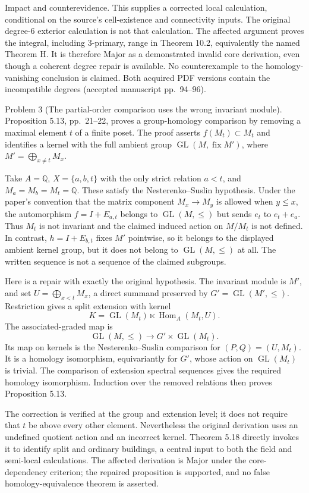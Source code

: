 \documentclass[10pt]{article}
\begin{document}
Impact and counterevidence. This supplies a corrected local calculation, conditional on the source’s cell-existence and connectivity inputs. The original degree-\(6\) exterior calculation is not that calculation. The affected argument proves the integral, including \(3\)-primary, range in Theorem 10.2, equivalently the named Theorem H. It is therefore Major as a demonstrated invalid core derivation, even though a coherent degree repair is available. No counterexample to the homology-vanishing conclusion is claimed. Both acquired PDF versions contain the incompatible degrees (accepted manuscript pp. 94–96).\par
Problem 3 (The partial-order comparison uses the wrong invariant module).  Proposition 5.13, pp. 21–22, proves a group-homology comparison by removing a maximal element \(t\) of a finite poset. The proof asserts \(f(M_t)\subset M_t\) and identifies a kernel with the full ambient group \(\operatorname{GL}(M,\operatorname{fix}M')\), where \(M'=\bigoplus_{x\ne t}M_x\).\par
Take \(A=\mathbb Q\), \(X=\{a,b,t\}\) with the only strict relation \(a<t\), and \(M_a=M_b=M_t=\mathbb Q\). These satisfy the Nesterenko–Suslin hypothesis. Under the paper’s convention that the matrix component \(M_x\to M_y\) is allowed when \(y\leq x\), the automorphism \(f=I+E_{a,t}\) belongs to \(\operatorname{GL}(M,\leq)\) but sends \(e_t\) to \(e_t+e_a\). Thus \(M_t\) is not invariant and the claimed induced action on \(M/M_t\) is not defined. In contrast, \(h=I+E_{b,t}\) fixes \(M'\) pointwise, so it belongs to the displayed ambient kernel group, but it does not belong to \(\operatorname{GL}(M,\leq)\) at all. The written sequence is not a sequence of the claimed subgroups.\par
Here is a repair with exactly the original hypothesis. The invariant module is \(M'\), and set \(U=\bigoplus_{x<t}M_x\), a direct summand preserved by \(G'=\operatorname{GL}(M',\leq)\). Restriction gives a split extension with kernel \[K=\operatorname{GL}(M_t)\ltimes\operatorname{Hom}_A(M_t,U).\] The associated-graded map is \[\operatorname{GL}(M,\leq)\longrightarrow G'\times\operatorname{GL}(M_t).\] Its map on kernels is the Nesterenko–Suslin comparison for \((P,Q)=(U,M_t)\). It is a homology isomorphism, equivariantly for \(G'\), whose action on \(\operatorname{GL}(M_t)\) is trivial. The comparison of extension spectral sequences gives the required homology isomorphism. Induction over the removed relations then proves Proposition 5.13.\par
The correction is verified at the group and extension level; it does not require that \(t\) be above every other element. Nevertheless the original derivation uses an undefined quotient action and an incorrect kernel. Theorem 5.18 directly invokes it to identify split and ordinary buildings, a central input to both the field and semi-local calculations. The affected derivation is Major under the core-dependency criterion; the repaired proposition is supported, and no false homology-equivalence theorem is asserted.\par
\end{document}
